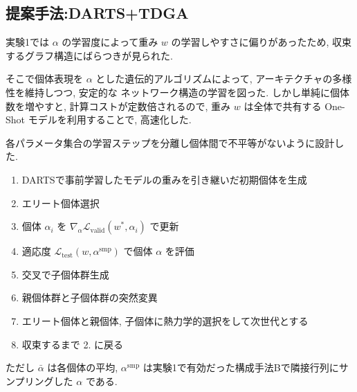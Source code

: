 \changeindent{0cm}
\subsection{提案手法:DARTS+TDGA}
\label{sec:pred.02}
\changeindent{2cm}

実験1では $\alpha$ の学習度によって重み $w$ の学習しやすさに偏りがあったため,
収束するグラフ構造にばらつきが見られた.

そこで個体表現を $\alpha$ とした遺伝的アルゴリズムによって,
アーキテクチャの多様性を維持しつつ, 安定的な
ネットワーク構造の学習を図った.
しかし単純に個体数を増やすと, 計算コストが定数倍されるので,
重み $w$ は全体で共有する One-Shot モデルを利用することで,
高速化した.

各パラメータ集合の学習ステップを分離し個体間で不平等がないように設計した.


\begin{enumerate}
  \item DARTSで事前学習したモデルの重みを引き継いだ初期個体を生成
  \item エリート個体選択
  \item 個体 $\alpha_i$ を $\displaystyle \nabla_\alpha \mathcal{L}_{\mathrm{valid}}(w^*, \alpha_i)$ で更新
  \item 適応度 $\displaystyle \mathcal{L}_{\mathrm{test}}(w, \alpha^\mathrm{smp})$ で個体 $\alpha$ を評価
  \item 交叉で子個体群生成
  \item 親個体群と子個体群の突然変異
  \item エリート個体と親個体, 子個体に熱力学的選択をして次世代とする
  \item 収束するまで 2. に戻る
\end{enumerate}
ただし
$\bar{\alpha}$ は各個体の平均,
$\alpha^\mathrm{smp}$ は実験1で有効だった構成手法Bで隣接行列にサンプリングした $\alpha$ である.


